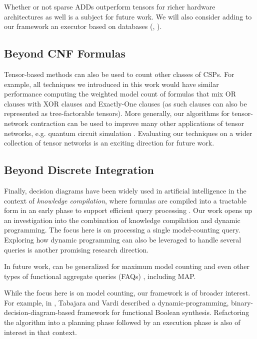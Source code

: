 Whether or not sparse ADDs outperform tensors for richer hardware architectures as well is a subject for future work. %
We will also consider adding to our framework an executor based on databases (\eg, \cite{fichte2020exploiting}).


\subsection{Beyond CNF Formulas}
Tensor-based methods can also be used to count other classes of CSPs. For example, all techniques we introduced in this work would have similar performance computing the weighted model count of formulas that mix OR clauses with XOR clauses and Exactly-One clauses (as such clauses can also be represented as tree-factorable tensors). More generally, our algorithms for tensor-network contraction can be used to improve many other applications of tensor networks, e.g. quantum circuit simulation \cite{MS08}. Evaluating our techniques on a wider collection of tensor networks is an exciting direction for future work. %

\subsection{Beyond Discrete Integration}
Finally, decision diagrams have been widely used in artificial intelligence in the context of \emph{knowledge compilation}, where formulas are compiled into a tractable form in an early phase to support efficient query processing \cite{koriche2013knowledge,LM17,darwiche2004new,OD15}.
Our work opens up an investigation into the combination of knowledge compilation and dynamic programming.
The focus here is on processing a single model-counting query.
Exploring how dynamic programming can also be leveraged to handle several queries is another promising research direction.

In future work, \procount{} can be generalized for maximum model counting \cite{fremont2017maximum} and even other types of functional aggregate queries (FAQs) \cite{KNR16}, including MAP.

While the focus here is on model counting, our framework is of broader interest.
For example, in \cite{tabajara2017factored}, Tabajara and Vardi described a dynamic-programming, binary-decision-diagram-based framework for functional Boolean synthesis.
Refactoring the algorithm into a planning phase followed by an execution phase is also of interest in that context.



